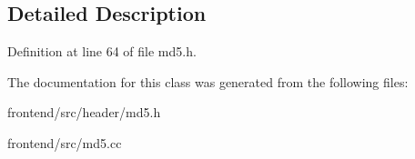 \subsection{Detailed Description}


Definition at line 64 of file md5.\-h.



The documentation for this class was generated from the following files\-:\begin{DoxyCompactItemize}
\item 
frontend/src/header/md5.\-h\item 
frontend/src/md5.\-cc\end{DoxyCompactItemize}
